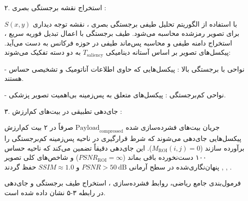 

۲. استخراج نقشه برجستگی بصری :\par

با استفاده از الگوریتم تحلیل طیفی برجستگی بصری ، نقشه توجه دیداری $S(x,\allowbreak{}y)$ برای تصویر رمزشده محاسبه می‌شود. طیف برجستگی با اعمال تبدیل فوریه سریع ، استخراج دامنه طیفی و محاسبه پس‌ماند طیفی  در حوزه فرکانس به دست می‌آید. پیکسل‌های تصویر بر اساس آستانه دینامیکی $T_{\mathrm{saliency}}$ به دو دسته تفکیک می‌شوند:\par

{-} نواحی با برجستگی بالا : پیکسل‌هایی که حاوی اطلاعات آناتومیک و تشخیصی حساس هستند.\par

{-} نواحی کم‌برجستگی : پیکسل‌های متعلق به پس‌زمینه بی‌اهمیت تصویر پزشکی.\par



۳. جای‌دهی تطبیقی در بیت‌های کم‌ارزش :\par

جریان بیت‌های فشرده‌سازی شده $\mathrm{Payload}_{\mathrm{compressed}}$ صرفاً در ۲ بیت کم‌ارزش  پیکسل‌هایی جای‌دهی می‌شوند که شرط قرارگیری در ناحیه پس‌زمینه کم‌برجستگی را برآورده سازند ($M_{\mathrm{ROI}}(i,\allowbreak{}j) = 0$). این جای‌دهی دقیقاً تضمین می‌کند که ناحیه حساس  ۱۰۰ دست‌نخورده باقی بماند ($PSNR_{\mathrm{ROI}} = \infty$) و شاخص‌های کلی تصویر پنهان‌نگاری‌شده در سطح آرمانی $PSNR > 50\mathrm{~dB}$ و $SSIM \approx 1.0$ حفظ گردند , , .\par



فرمول‌بندی جامع ریاضی، روابط فشرده‌سازی ، استخراج طیف برجستگی و جای‌دهی  در رابطه ۳{-}۵ نشان داده شده است.\par

